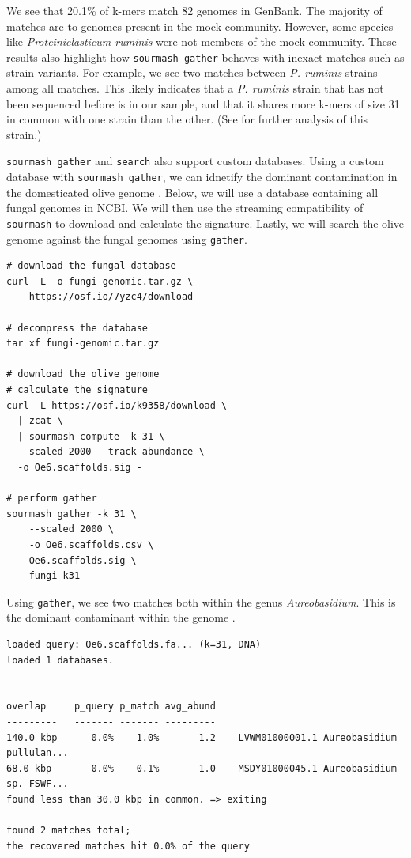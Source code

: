\documentclass[10pt,a4paper,twocolumn]{article}
\begin{document}
We see that 20.1\% of k-mers match 82 genomes in GenBank. The majority of matches are to genomes present in the mock community. However, some species like \textit{Proteiniclasticum ruminis} were not members of the mock community. These results also highlight how \lstinline{sourmash gather} behaves with inexact matches such as strain variants. For example, we see two matches between \textit{P. ruminis} strains among all matches. This likely indicates that a \textit{P. ruminis} strain that has not been sequenced before is in our sample, and that it shares more k-mers of size 31 in common with one strain than the other. (See \cite{spacegraphcats} for further analysis of this strain.)

\lstinline{sourmash gather} and \lstinline{search} also support custom databases. Using a custom database with \lstinline{sourmash gather}, we can idnetify the dominant contamination in the domesticated olive genome \cite{Reiter2018}. Below, we will use a database containing all fungal genomes in NCBI. We will then use the streaming compatibility of \lstinline{sourmash} to download and calculate the signature. Lastly, we will search the olive genome against the fungal genomes using \lstinline{gather}.

\begin{lstlisting}
# download the fungal database
curl -L -o fungi-genomic.tar.gz \ 
    https://osf.io/7yzc4/download

# decompress the database
tar xf fungi-genomic.tar.gz 

# download the olive genome 
# calculate the signature
curl -L https://osf.io/k9358/download \ 
  | zcat \ 
  | sourmash compute -k 31 \ 
  --scaled 2000 --track-abundance \ 
  -o Oe6.scaffolds.sig -
 
# perform gather
sourmash gather -k 31 \ 
    --scaled 2000 \ 
    -o Oe6.scaffolds.csv \
    Oe6.scaffolds.sig \ 
    fungi-k31
\end{lstlisting}

Using \lstinline{gather}, we see two matches both within the genus \textit{Aureobasidium}. This is the dominant contaminant within the genome \cite{Reiter2018}.

\begin{lstlisting}[basicstyle=\tiny,]
loaded query: Oe6.scaffolds.fa... (k=31, DNA)
loaded 1 databases.


overlap     p_query p_match avg_abund
---------   ------- ------- ---------
140.0 kbp      0.0%    1.0%       1.2    LVWM01000001.1 Aureobasidium pullulan...
68.0 kbp       0.0%    0.1%       1.0    MSDY01000045.1 Aureobasidium sp. FSWF...
found less than 30.0 kbp in common. => exiting

found 2 matches total;
the recovered matches hit 0.0% of the query
\end{lstlisting}
\end{document}
